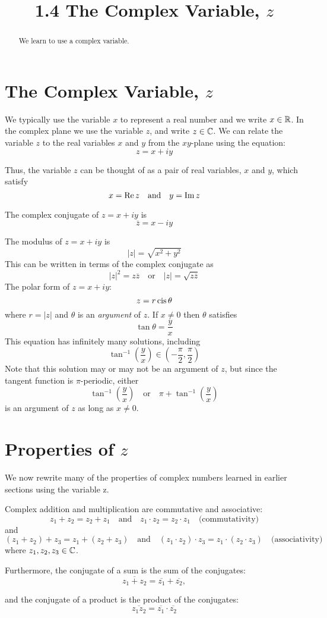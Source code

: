 \documentclass[handout]{ximera}
\title{1.4 The Complex Variable, $z$}
\begin{document}
\begin{abstract}
We learn to use a complex variable.
\end{abstract}

\maketitle

\section{The Complex Variable, $z$}

We typically use the variable $x$ to represent a real number and we write $x \in \mathbb R$.
In the complex plane we use the variable $z$, and write $z \in \mathbb C$. We can relate the variable $z$ to the real variables $x$ and $y$
from the $xy$-plane using the equation:
\[
z = x+iy
\]

Thus, the variable $z$ can be thought of as a pair of real variables, $x$ and $y$, 
which satisfy
\[
x = \operatorname{Re}{z} \quad \mbox{and} \quad y = \operatorname{Im}{z}
\]

The complex conjugate of $z = x+iy$ is
\[
\overline{z} = x-iy
\]

The modulus of $z = x+iy$ is
\[
|z| = \sqrt{x^2 + y^2}
\]
This can be written in terms of the complex conjugate as
\[
|z|^2 = z\overline{z} \quad \mbox{or} \quad |z| = \sqrt{z\overline{z}}
\]
The polar form of $z = x+iy$:
\[
z = r \operatorname{cis} \theta
\]
where $r = |z|$ and $\theta$ is an {\it argument} of $z$. If $x \neq 0$ then $\theta$ satisfies
\[
\tan \theta = \frac{y}{x}
\]
This equation has infinitely many solutions, including
\[ 
\tan^{-1} \left(\frac{y}{x}\right) \in \left(-\frac{\pi}{2}, \frac{\pi}{2}\right)
\]
Note that this solution may or may not be an argument of $z$, but since the tangent function is $\pi$-periodic,
either
\[
\tan^{-1} \left(\frac{y}{x}\right) \quad \mbox{or} \quad \pi + \tan^{-1} \left(\frac{y}{x}\right)
\]
is an argument of $z$ as long as $x \neq 0$.


\section{Properties of $z$}


We now rewrite many of the properties of complex numbers learned in earlier sections using the variable z.


Complex addition and multiplication are commutative and associative: 
\[
z_1 + z_2 = z_2 + z_1 \quad \mbox{and} \quad z_1 \cdot z_2 = z_2 \cdot z_1 \quad \mbox{(commutativity)}
\]
and
\[
(z_1 + z_2) + z_3  = z_1 + (z_2 + z_3) \quad \mbox{and} \quad (z_1 \cdot z_2) \cdot z_3  = z_1 \cdot (z_2 \cdot z_3) \quad \mbox{(associativity)}
\]
where $z_1, z_2, z_3 \in \mathbb C$.

Furthermore, the conjugate of a sum is the sum of the conjugates:
\[
\overline{z_1 + z_2} = \overline{z_1} + \overline{z_2},
\]

and the conjugate of a product is the product of the conjugates:
\[
\overline{z_1 z_2} = \overline{z_1} \cdot \overline{z_2}
\]
\end{document}
